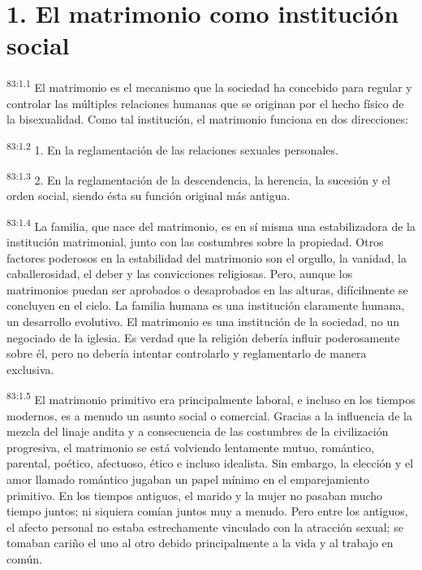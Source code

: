 \documentclass[twoside, 11pt]{book}
\begin{document}
\section*{1. El matrimonio como institución social}
\par
\textsuperscript{83:1.1} El matrimonio es el mecanismo que la sociedad ha concebido para regular y controlar las múltiples relaciones humanas que se originan por el hecho físico de la bisexualidad. Como tal institución, el matrimonio funciona en dos direcciones:

\par
\textsuperscript{83:1.2} 1. En la reglamentación de las relaciones sexuales personales.

\par
\textsuperscript{83:1.3} 2. En la reglamentación de la descendencia, la herencia, la sucesión y el orden social, siendo ésta su función original más antigua.

\par
\textsuperscript{83:1.4} La familia, que nace del matrimonio, es en sí misma una estabilizadora de la institución matrimonial, junto con las costumbres sobre la propiedad. Otros factores poderosos en la estabilidad del matrimonio son el orgullo, la vanidad, la caballerosidad, el deber y las convicciones religiosas. Pero, aunque los matrimonios puedan ser aprobados o desaprobados en las alturas, difícilmente se concluyen en el cielo. La familia humana es una institución claramente humana, un desarrollo evolutivo. El matrimonio es una institución de la sociedad, no un negociado de la iglesia. Es verdad que la religión debería influir poderosamente sobre él, pero no debería intentar controlarlo y reglamentarlo de manera exclusiva.

\par
\textsuperscript{83:1.5} El matrimonio primitivo era principalmente laboral, e incluso en los tiempos modernos, es a menudo un asunto social o comercial. Gracias a la influencia de la mezcla del linaje andita y a consecuencia de las costumbres de la civilización progresiva, el matrimonio se está volviendo lentamente mutuo, romántico, parental, poético, afectuoso, ético e incluso idealista. Sin embargo, la elección y el amor llamado romántico jugaban un papel mínimo en el emparejamiento primitivo. En los tiempos antiguos, el marido y la mujer no pasaban mucho tiempo juntos; ni siquiera comían juntos muy a menudo. Pero entre los antiguos, el afecto personal no estaba estrechamente vinculado con la atracción sexual; se tomaban cariño el uno al otro debido principalmente a la vida y al trabajo en común.
\end{document}
